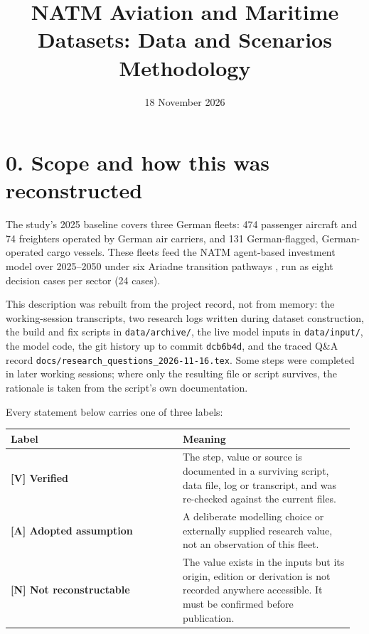 \documentclass[11pt,a4paper]{article}
\title{NATM Aviation and Maritime Datasets: Data and Scenarios Methodology}
\author{}
\date{18 November 2026}
\begin{document}
\maketitle
\tableofcontents

\section*{0. Scope and how this was reconstructed}

The study's 2025 baseline covers three German fleets: 474 passenger aircraft and 74 freighters operated by German air carriers, and 131 German-flagged, German-operated cargo vessels. These fleets feed the NATM agent-based investment model \citep{khanra2025,natm} over 2025–2050 under six Ariadne transition pathways \citep{luderer2025}, run as eight decision cases per sector (24 cases).

This description was rebuilt from the project record, not from memory: the working-session transcripts, two research logs written during dataset construction, the build and fix scripts in \texttt{data/\allowbreak{}archive/\allowbreak{}}, the live model inputs in \texttt{data/\allowbreak{}input/\allowbreak{}}, the model code, the git history up to commit \texttt{dcb6b4d}, and the traced Q\&A record \texttt{docs/\allowbreak{}research\_\allowbreak{}questions\_\allowbreak{}2026-11-16.\allowbreak{}tex}. Some steps were completed in later working sessions; where only the resulting file or script survives, the rationale is taken from the script's own documentation.

Every statement below carries one of three labels:

{\small\setlength{\tabcolsep}{3pt}
\begin{longtable}{>{\raggedright\arraybackslash}p{0.478\linewidth}>{\raggedright\arraybackslash}p{0.478\linewidth}}
\toprule
\textbf{Label} & \textbf{Meaning} \tabularnewline
\midrule
\endhead
\textbf{[V] Verified} & The step, value or source is documented in a surviving script, data file, log or transcript, and was re-checked against the current files. \tabularnewline
\textbf{[A] Adopted assumption} & A deliberate modelling choice or externally supplied research value, not an observation of this fleet. \tabularnewline
\textbf{[N] Not reconstructable} & The value exists in the inputs but its origin, edition or derivation is not recorded anywhere accessible. It must be confirmed before publication. \tabularnewline
\bottomrule
\end{longtable}}
\end{document}
